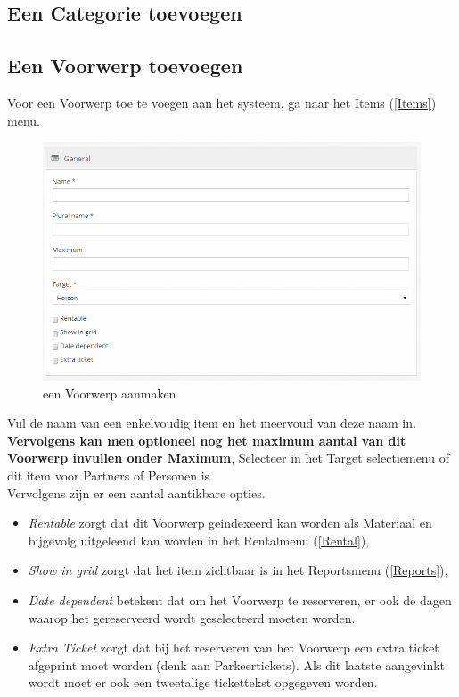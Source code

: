 \documentclass[]{memoir}
\begin{document}
\subsection{Een Categorie toevoegen} \label{SetCategory}
\subsection{Een Voorwerp toevoegen} \label{SetItem}
Voor een Voorwerp toe te voegen aan het systeem, ga naar het Items (\ref{Items}) menu. \\
\begin{figure}[H]
	\includegraphics[width=\linewidth]{addItem_left}
	\caption{een Voorwerp aanmaken}
\end{figure}
Vul de naam van een enkelvoudig item en het meervoud van deze naam in.
\textbf{Vervolgens kan men optioneel nog het maximum aantal van dit Voorwerp invullen onder Maximum}, 
Selecteer in het Target selectiemenu of dit item voor Partners of Personen is. \\
Vervolgens zijn er een aantal aantikbare opties.
\begin{itemize}
	\item \textsl{Rentable} zorgt dat dit Voorwerp geindexeerd kan worden als Materiaal en bijgevolg uitgeleend kan worden in het Rentalmenu (\ref{Rental}), 
	\item \textsl{Show in grid} zorgt dat het item zichtbaar is in het Reportsmenu (\ref{Reports}), 
	\item \textsl{Date dependent} betekent dat om het Voorwerp te reserveren, er ook de dagen waarop het gereserveerd wordt geselecteerd moeten worden.
	\item \textsl{Extra Ticket} zorgt dat bij het reserveren van het Voorwerp een extra ticket afgeprint moet worden (denk aan Parkeertickets). Als dit laatste aangevinkt wordt moet er ook een tweetalige tickettekst opgegeven worden.
\end{itemize} 
\end{document}

